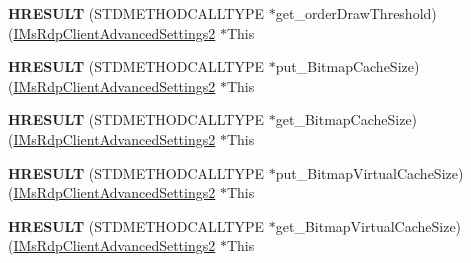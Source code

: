 \begin{DoxyCompactItemize}
\item 
\mbox{\label{struct_m_s_t_s_c_lib_1_1_i_ms_rdp_client_advanced_settings2_vtbl_a4cba294f32f1c8d0952b2954e0ed5109}} 
{\bfseries H\+R\+E\+S\+U\+LT} (S\+T\+D\+M\+E\+T\+H\+O\+D\+C\+A\+L\+L\+T\+Y\+PE $\ast$get\+\_\+order\+Draw\+Threshold)(\hyperlink{interface_m_s_t_s_c_lib_1_1_i_ms_rdp_client_advanced_settings2}{I\+Ms\+Rdp\+Client\+Advanced\+Settings2} $\ast$This
\item 
\mbox{\label{struct_m_s_t_s_c_lib_1_1_i_ms_rdp_client_advanced_settings2_vtbl_a029013f9979810d477c3153862155c6e}} 
{\bfseries H\+R\+E\+S\+U\+LT} (S\+T\+D\+M\+E\+T\+H\+O\+D\+C\+A\+L\+L\+T\+Y\+PE $\ast$put\+\_\+\+Bitmap\+Cache\+Size)(\hyperlink{interface_m_s_t_s_c_lib_1_1_i_ms_rdp_client_advanced_settings2}{I\+Ms\+Rdp\+Client\+Advanced\+Settings2} $\ast$This
\item 
\mbox{\label{struct_m_s_t_s_c_lib_1_1_i_ms_rdp_client_advanced_settings2_vtbl_a30b32b2ebc581412e708888e6246906b}} 
{\bfseries H\+R\+E\+S\+U\+LT} (S\+T\+D\+M\+E\+T\+H\+O\+D\+C\+A\+L\+L\+T\+Y\+PE $\ast$get\+\_\+\+Bitmap\+Cache\+Size)(\hyperlink{interface_m_s_t_s_c_lib_1_1_i_ms_rdp_client_advanced_settings2}{I\+Ms\+Rdp\+Client\+Advanced\+Settings2} $\ast$This
\item 
\mbox{\label{struct_m_s_t_s_c_lib_1_1_i_ms_rdp_client_advanced_settings2_vtbl_a464b0a8f1fb58236377cf20a0d1959f6}} 
{\bfseries H\+R\+E\+S\+U\+LT} (S\+T\+D\+M\+E\+T\+H\+O\+D\+C\+A\+L\+L\+T\+Y\+PE $\ast$put\+\_\+\+Bitmap\+Virtual\+Cache\+Size)(\hyperlink{interface_m_s_t_s_c_lib_1_1_i_ms_rdp_client_advanced_settings2}{I\+Ms\+Rdp\+Client\+Advanced\+Settings2} $\ast$This
\item 
\mbox{\label{struct_m_s_t_s_c_lib_1_1_i_ms_rdp_client_advanced_settings2_vtbl_abaa023960ea2a8437db87e5908946a04}} 
{\bfseries H\+R\+E\+S\+U\+LT} (S\+T\+D\+M\+E\+T\+H\+O\+D\+C\+A\+L\+L\+T\+Y\+PE $\ast$get\+\_\+\+Bitmap\+Virtual\+Cache\+Size)(\hyperlink{interface_m_s_t_s_c_lib_1_1_i_ms_rdp_client_advanced_settings2}{I\+Ms\+Rdp\+Client\+Advanced\+Settings2} $\ast$This

\end{DoxyCompactItemize}
